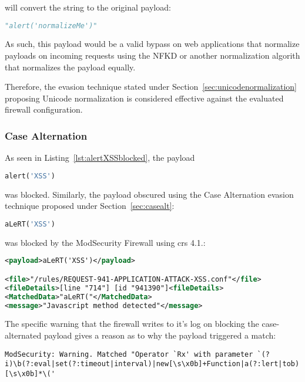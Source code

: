 will convert the string to the original payload:

\begin{lstlisting}[style=basicStyle, language=Python]
"alert('normalizeMe')"
\end{lstlisting}

As such, this payload would be a valid bypass on web applications that normalize payloads on incoming requests using the NFKD or another normalization algorith that normalizes the payload equally. 

Therefore, the evasion technique stated under Section~\ref{sec:unicodenormalization} proposing Unicode normalization is considered effective against the evaluated firewall configuration.


\subsubsection{Case Alternation}
\label{sec:casealternationevaluation}
As seen in Listing~\ref{lst:alertXSSblocked}, the payload 

\begin{lstlisting}[style=basicStyle, language=Python]
alert('XSS')
\end{lstlisting}

was blocked. Similarly, the payload obscured using the Case Alternation evasion technique proposed under Section~\ref{sec:casealt}:

\begin{lstlisting}[style=basicStyle, language=Python]
aLeRT('XSS')
\end{lstlisting}

was blocked by the ModSecurity Firewall using \acrshort{crs} 4.1.:

\begin{lstlisting}[style=ruleStyle, language=XML, caption=aLeRT('XSS') blocked, label=lst:alertcasealternationblocked]
<payload>aLeRT('XSS')</payload>

<file>"/rules/REQUEST-941-APPLICATION-ATTACK-XSS.conf"</file>
<fileDetails>[line "714"] [id "941390"]<fileDetails>
<MatchedData>"aLeRT("</MatchedData>
<message>"Javascript method detected"</message>
\end{lstlisting}

The specific warning that the firewall writes to it's log on blocking the case-alternated payload gives a reason as to why the payload triggered a match:

\begin{lstlisting}[style=basicStyle]
ModSecurity: Warning. Matched "Operator `Rx' with parameter `(?i)\b(?:eval|set(?:timeout|interval)|new[\s\x0b]+Function|a(?:lert|tob)|btoa|prompt|confirm)[\s\x0b]*\('
\end{lstlisting}

